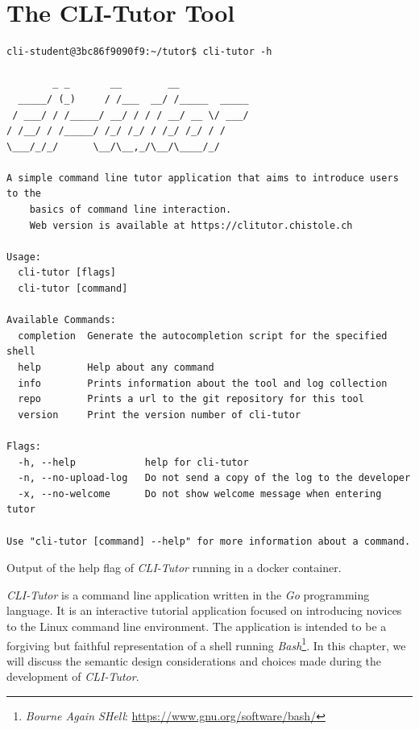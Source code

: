 \chapter{The CLI-Tutor Tool}
%
\label{chap:clitutor}
\begin{listing}[htbp]
\begin{verbatim}
cli-student@3bc86f9090f9:~/tutor$ cli-tutor -h

        _ _       __        __
  _____/ (_)     / /___  __/ /_____  _____
 / ___/ / /_____/ __/ / / / __/ __ \/ ___/
/ /__/ / /_____/ /_/ /_/ / /_/ /_/ / /
\___/_/_/      \__/\__,_/\__/\____/_/

A simple command line tutor application that aims to introduce users to the
    basics of command line interaction.
    Web version is available at https://clitutor.chistole.ch

Usage:
  cli-tutor [flags]
  cli-tutor [command]

Available Commands:
  completion  Generate the autocompletion script for the specified shell
  help        Help about any command
  info        Prints information about the tool and log collection
  repo        Prints a url to the git repository for this tool
  version     Print the version number of cli-tutor

Flags:
  -h, --help            help for cli-tutor
  -n, --no-upload-log   Do not send a copy of the log to the developer
  -x, --no-welcome      Do not show welcome message when entering tutor

Use "cli-tutor [command] --help" for more information about a command.
\end{verbatim}
\caption{Output of the help flag of \textit{CLI-Tutor} running in a docker container.}
\label{lst:clihelp}
\end{listing}
\clearpage

\textit{CLI-Tutor} is a command line application written in the \textit{Go}
programming language. It is an interactive tutorial application focused on introducing
novices to the Linux command line environment. The application is intended to
be a forgiving but faithful representation of a shell running
\textit{Bash}\footnote{\textit{Bourne Again SHell}:
\url{https://www.gnu.org/software/bash/}}. In this chapter, we will discuss the
semantic design considerations and choices made during the development of
\textit{CLI-Tutor}.

